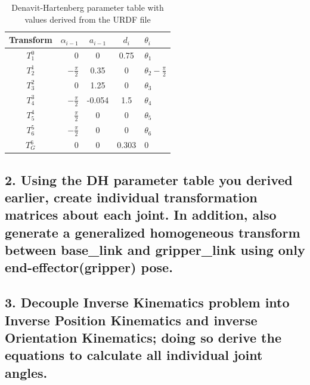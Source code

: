 \documentclass{article}
\begin{document}
\begin{table}
\centering
\begin{tabular}{|c|r|c|c|l|}
    \hline
    Transform & $\alpha _{i-1}$ & $a_{i-1}$ & $d_i$ & $\theta _i$ \\ \hline
    $T_1^0$ & 0 & 0 & 0.75 & $\theta _1$ \\ \hline
    $T_2^1$ & $-\frac{\pi}{2}$ & 0.35 & 0 & $\theta _2 - \frac{\pi}{2}$ \\ \hline
    $T_3^2$ & 0 & 1.25 & 0 & $\theta _3$ \\ \hline
    $T_4^3$ & $-\frac{\pi}{2}$ & -0.054 & 1.5 & $\theta _4$ \\ \hline
    $T_5^4$ & $\frac{\pi}{2}$ & 0 & 0 & $\theta _5$ \\ \hline
    $T_6^5$ & $-\frac{\pi}{2}$ & 0 & 0 & $\theta _6$ \\ \hline
    $T_G^6$ & 0 & 0 & 0.303 & 0 \\ \hline

\end{tabular}
\caption{\label{tab:table-name}Denavit-Hartenberg parameter table with values derived from the URDF file}
\end{table}

\subsection{2. Using the DH parameter table you derived earlier, create individual transformation matrices about each joint. In addition, also generate a generalized homogeneous transform between base\_link and gripper\_link using only end-effector(gripper) pose.}

\subsection{3. Decouple Inverse Kinematics problem into Inverse Position Kinematics and inverse Orientation Kinematics; doing so derive the equations to calculate all individual joint angles.}
\end{document}
